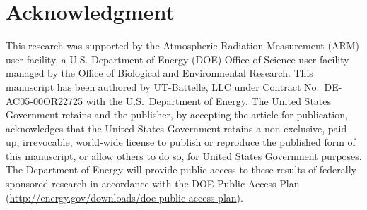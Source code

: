 \documentclass[conference]{IEEEtran}
\begin{document}
\section*{Acknowledgment}
This research was supported by the Atmospheric Radiation Measurement (ARM) user 
facility, a U.S. Department of Energy (DOE) Office of Science user facility 
managed by the Office of Biological and Environmental Research.
This manuscript has been authored by UT-Battelle, LLC under Contract No.\
DE-AC05-00OR22725 with the U.S.\ Department of Energy.  The United States
Government retains and the publisher, by accepting the article for
publication, acknowledges that the United States Government retains a
non-exclusive, paid-up, irrevocable, world-wide license to publish or
reproduce the published form of this manuscript, or allow others to do
so, for United States Government purposes.  The Department of Energy
will provide public access to these results of federally sponsored
research in accordance with the DOE Public Access
Plan (\url{http://energy.gov/downloads/doe-public-access-plan}).

 

\end{document}
